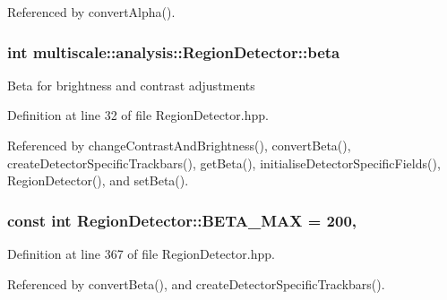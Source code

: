 Referenced by convert\-Alpha().

\hypertarget{classmultiscale_1_1analysis_1_1RegionDetector_a23c831170c2264dd7e59067a1a7d3c8e}{
\subsubsection[{beta}]{\setlength{\rightskip}{0pt plus 5cm}int multiscale\-::analysis\-::\-Region\-Detector\-::beta\hspace{0.3cm}{\ttfamily [private]}}}\label{classmultiscale_1_1analysis_1_1RegionDetector_a23c831170c2264dd7e59067a1a7d3c8e}
Beta for brightness and contrast adjustments 

Definition at line 32 of file Region\-Detector.\-hpp.



Referenced by change\-Contrast\-And\-Brightness(), convert\-Beta(), create\-Detector\-Specific\-Trackbars(), get\-Beta(), initialise\-Detector\-Specific\-Fields(), Region\-Detector(), and set\-Beta().

\hypertarget{classmultiscale_1_1analysis_1_1RegionDetector_ad2c6485f637cae5abee0303b41df1480}{
\subsubsection[{B\-E\-T\-A\-\_\-\-M\-A\-X}]{\setlength{\rightskip}{0pt plus 5cm}const int Region\-Detector\-::\-B\-E\-T\-A\-\_\-\-M\-A\-X = 200\hspace{0.3cm}{\ttfamily [static]}, {\ttfamily [private]}}}\label{classmultiscale_1_1analysis_1_1RegionDetector_ad2c6485f637cae5abee0303b41df1480}


Definition at line 367 of file Region\-Detector.\-hpp.



Referenced by convert\-Beta(), and create\-Detector\-Specific\-Trackbars().

